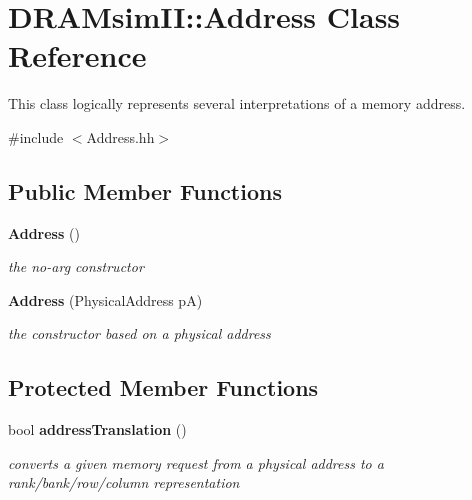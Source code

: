 \section{DRAMsimII::Address Class Reference}
\label{class_d_r_a_msim_i_i_1_1_address}


This class logically represents several interpretations of a memory address.  




{\ttfamily \#include $<$Address.hh$>$}

\subsection*{Public Member Functions}
\begin{DoxyCompactItemize}
\item 
{\bf Address} ()\label{class_d_r_a_msim_i_i_1_1_address_a63f910c09d93bdd16d3744e47d13dc0e}

\begin{DoxyCompactList}\small\item\em the no-\/arg constructor \item\end{DoxyCompactList}\item 
{\bf Address} (PhysicalAddress pA)\label{class_d_r_a_msim_i_i_1_1_address_a8204347dbc9ff580abd2446bb7edd255}

\begin{DoxyCompactList}\small\item\em the constructor based on a physical address \item\end{DoxyCompactList}\end{DoxyCompactItemize}
\subsection*{Protected Member Functions}
\begin{DoxyCompactItemize}
\item 
bool {\bf addressTranslation} ()
\begin{DoxyCompactList}\small\item\em converts a given memory request from a physical address to a rank/bank/row/column representation \item\end{DoxyCompactList}\end{DoxyCompactItemize}
